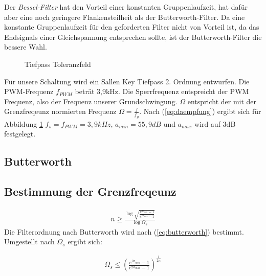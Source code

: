 Der \emph{Bessel-Filter} hat den Vorteil einer konstanten Gruppenlaufzeit, hat dafür aber eine noch geringere Flankensteilheit als der Butterworth-Filter.
Da eine konstante Gruppenlaufzeit für den geforderten Filter nicht von Vorteil ist, da das Endsignals einer Gleichspannung entsprechen sollte, ist der Butterworth-Filter
die bessere Wahl.


\begin{figure}[H]
\centering
{}
\caption{Tiefpass Toleranzfeld}%
\label{fig:analog}
\end{figure}
Für unsere Schaltung wird ein Sallen Key Tiefpass 2. Ordnung entwurfen. Die PWM-Frequenz $f_{PWM}$ beträt 3,9kHz.
Die Sperrfrequenz entspreicht der PWM Frequenz, also der Frequenz unserer Grundschwingung. $\Omega$ entspricht der mit der Grenzfreqeunz 
normierten Frequenz $\Omega=\frac{f}{f_g}$. Nach (\ref{eq:daempfung}) ergibt sich für Abbildung \ref{fig:analog}
$f_s=f_{PWM}=3,9 kHz$, $a_{min}=55,9 dB$ und $a_{max}$ wird auf 3dB festgelegt.



\subsection{Butterworth}
\subsection{Bestimmung der Grenzfreqeunz}
\begin{align}
n \ge \frac{\log{\sqrt{\frac{e^{2a_{min}}-1}{e^{2a_{max}}-1}}}}{\log{\Omega_s}}
\label{eq:butterworth}
\end{align}
Die Filterordnung nach Butterworth wird nach (\ref{eq:butterworth}) bestimmt. Umgestellt nach $\Omega_s$ ergibt sich:

\begin{align}
\Omega_s \le  \left(\frac{e^{2a_{min}}-1}{e^{2a_{max}}-1}\right)^{\frac{1}{2n}}
\end{align}




